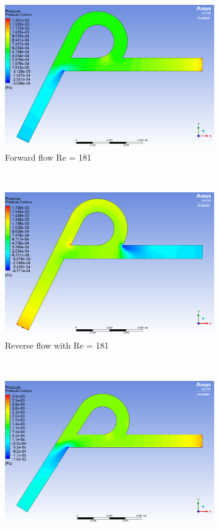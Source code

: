 \begin{figure}[H]
 \centering
\begin{subfigure}{.45\textwidth}
  \centering
  \includegraphics[width=.9\linewidth]{images/task2/L200/forward181.png}
  \caption{Forward flow Re = 181}
  \label{fig:x_d_norm}
\end{subfigure}%
~
\begin{subfigure}{.45\textwidth}
  \centering
  \includegraphics[width=.9\linewidth]{images/task2/L200/reverse181.png}
  \caption{Reverse flow with Re = 181}
  \label{fig:x_d_norm_actual}
\end{subfigure}
~
\begin{subfigure}{.45\textwidth}
  \centering
  \includegraphics[width=.9\linewidth]{images/task2/L200/forward362.png}

\end{subfigure}
\end{figure}

